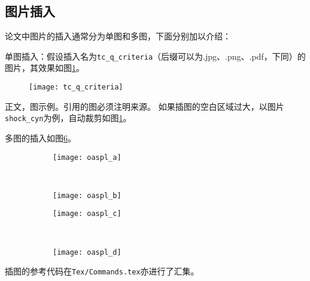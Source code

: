 \subsection{图片插入}

论文中图片的插入通常分为单图和多图，下面分别加以介绍：

单图插入：假设插入名为\verb|tc_q_criteria|（后缀可以为.jpg、.png、.pdf，下同）的图片，其效果如图\ref{fig:tc_q_criteria}。
\begin{figure}[!htbp]
    \centering
    \texttt{[image: tc\_q\_criteria]}
    \label{fig:tc_q_criteria}
\end{figure}


正文，图示例。引用的图必须注明来源。
如果插图的空白区域过大，以图片\verb|shock_cyn|为例，自动裁剪如图\ref{fig:tc_q_criteria}。


多图的插入如图\ref{fig:oaspl}。
\begin{figure}[!htbp]
    \centering
    \begin{subfigure}[b]{0.35\textwidth}
      \texttt{[image: oaspl\_a]}
      \caption{}
      \label{fig:oaspl_a}
    \end{subfigure}%
    ~%
    \begin{subfigure}[b]{0.35\textwidth}
      \texttt{[image: oaspl\_b]}
      \caption{}
      \label{fig:oaspl_b}
    \end{subfigure}
    \begin{subfigure}[b]{0.35\textwidth}
      \texttt{[image: oaspl\_c]}
      \caption{}
      \label{fig:oaspl_c}
    \end{subfigure}%
    ~%
    \begin{subfigure}[b]{0.35\textwidth}
      \texttt{[image: oaspl\_d]}
      \caption{}
      \label{fig:oaspl_d}
    \end{subfigure}
    \label{fig:oaspl}
\end{figure}

插图的参考代码在\verb|Tex/Commands.tex|亦进行了汇集。

